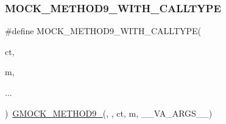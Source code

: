 \subsubsection{\texorpdfstring{MOCK\_METHOD9\_WITH\_CALLTYPE}{MOCK\_METHOD9\_WITH\_CALLTYPE}}
{\footnotesize\ttfamily \#define M\+O\+C\+K\+\_\+\+M\+E\+T\+H\+O\+D9\+\_\+\+W\+I\+T\+H\+\_\+\+C\+A\+L\+L\+T\+Y\+PE(\begin{DoxyParamCaption}\item[{}]{ct,  }\item[{}]{m,  }\item[{}]{... }\end{DoxyParamCaption})~\mbox{\hyperlink{gmock-generated-function-mockers_8h_aa820171a19cc587c247dbe05cbffc55f}{G\+M\+O\+C\+K\+\_\+\+M\+E\+T\+H\+O\+D9\+\_\+}}(, , ct, m, \+\_\+\+\_\+\+V\+A\+\_\+\+A\+R\+G\+S\+\_\+\+\_\+)}

